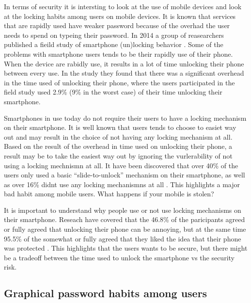     In terms of security it is intersting to look at the use of mobile devices and look at the locking habits among users on mobile devices. It is known that services that are rapidly used have weaker password because of the overhad the user needs to spend on typeing their password. In 2014 a group of reasearchers published a fieild study of smartphone (un)locking behavior \cite{habits3}. Some of the problems with smartphone users tends to be their rapidly use of their phone. When the device are rabidly use, it results in a lot of time unlocking their phone between every use. In the study they found that there was a significant overhead in the time used of unlocking their phone, where the users participated in the field study used 2.9\% (9\% in the worst case) of their time unlocking their smartphone. 
    
    Smartphones in use today do not require their users to have a locking mechanism on their smartphone. It is well known that users tends to choose to easiet way out and may result in the choice of not having any locking mechanism at all. Based on the result of the overhead in time used on unlocking their phone, a result may be to take the easiest way out by ignoring the vurlerability of not using a locking mechnismn at all. It have been discovered that over 40\% of the users only used a basic ``slide-to-unlock'' mechanism on their smartphone, as well as over 16\% didnt use any locking mechanismns at all \cite{habits3}. This highlights a major bad habit among mobile users. What happens if your mobile is stolen? 

    It is important to understand why people use or not use locking mechanisms on their smartphone. Reseach have covered that the 46.8\% of the paricipants agreed or fully agreed that unlocking their phone can be annoying, but at the same time 95.5\% of the somewhat or fully agreed that they liked the idea that their phone was protected \cite{habits3}. This highlights that the users wants to be secure, but there might be a tradeoff between the time used to unlock the smartphone vs the security risk.


    \subsection{Graphical password habits among users}



